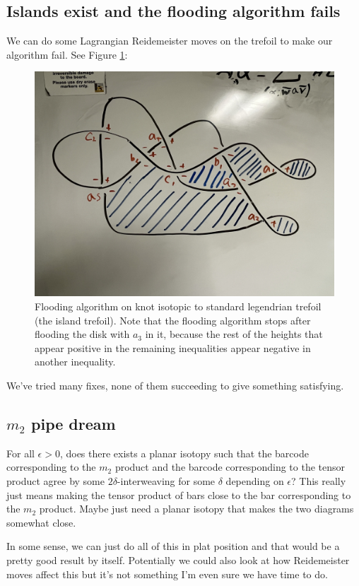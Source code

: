 \documentclass[11pt,oneside]{amsart}
\begin{document}
\subsection{Islands exist and the flooding algorithm fails}
We can do some Lagrangian Reidemeister moves on the trefoil to make our algorithm fail. See Figure \ref{fig:failure}:
\begin{figure}
    \centering
    \includegraphics[width=\linewidth]{Journals/IMG_2741.jpg}
    \caption{Flooding algorithm on knot isotopic to standard legendrian trefoil (the island trefoil). Note that the flooding algorithm stops after flooding the disk with $a_3$ in it, because the rest of the heights that appear positive in the remaining inequalities appear negative in another inequality. }
    \label{fig:failure}
\end{figure}
We've tried many fixes, none of them succeeding to give something satisfying.
\subsection{$m_2$ pipe dream}
For all $\epsilon>0$, does there exists a planar isotopy such that the barcode corresponding to the $m_2$ product and the barcode corresponding to the tensor product agree by some $2\delta$-interweaving for some $\delta$ depending on $\epsilon$? This really just means making the tensor product of bars close to the bar corresponding to the $m_2$ product. Maybe just need a planar isotopy that makes the two diagrams somewhat close.

In some sense, we can just do all of this in plat position and that would be a pretty good result by itself. Potentially we could also look at how Reidemeister moves affect this but it's not something I'm even sure we have time to do.
\end{document}
